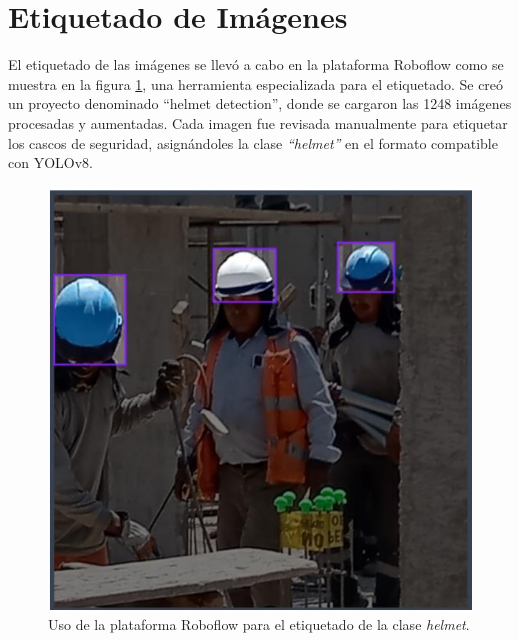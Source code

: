 \section{Etiquetado de Imágenes}

El etiquetado de las imágenes se llevó a cabo en la plataforma Roboflow como se muestra en la figura \ref{fig:roboflow_use}, una herramienta especializada para el etiquetado. Se creó un proyecto denominado ``helmet detection'', donde se cargaron las 1248 imágenes procesadas y aumentadas. Cada imagen fue revisada manualmente para etiquetar los cascos de seguridad, asignándoles la clase \textit{``helmet''} en el formato compatible con YOLOv8.

\begin{figure}[!ht]
  \centering
  \includegraphics[width=.49\linewidth]{images/roboflow_use.png}
  \caption{Uso de la plataforma Roboflow para el etiquetado de la clase \textit{helmet}.}
  \label{fig:roboflow_use}
\end{figure}

